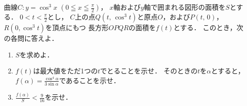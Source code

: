 \documentclass[../../main.tex]{subfiles}
\begin{document}
曲線$C:y=\cos^3x$ $\displaystyle\left( 0 \leqq x \leqq \frac{\pi}{2} \right)$，
$x$軸および$y$軸で囲まれる図形の面積を$S$とする．
$\displaystyle 0<t<\frac{\pi}{2}$とし，
$C$上の点$Q(t, \, \cos^3t)$と原点$O$，および$P(t, \, 0)$，$R(0, \cos^3t)$を頂点にもつ
長方形$OPQR$の面積を$f(t)$とする．
このとき，次の各問に答えよ．
\begin{enumerate}
  \item$S$を求めよ．
  \item$f(t)$は最大値をただ1つの$t$でとることを示せ．
    そのときの$t$を$\alpha$とすると，
    $\displaystyle f(\alpha)=\frac{\cos^4\alpha}{3\sin\alpha}$であることを示せ．
  \item$\displaystyle \frac{f(\alpha)}{S}<\frac{9}{16}$を示せ．
\end{enumerate}
\end{document}
